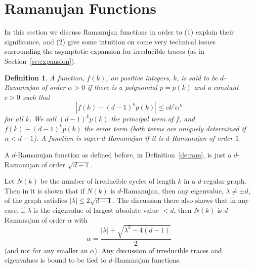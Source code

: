 \documentclass[12pt]{article}
\newtheorem{definition}[theorem]{Definition}
\newcommand{\dtreelike}{{$d$-Ramanujan}}
\begin{document}
\section{Ramanujan Functions}

In this section we discuss Ramanujan functions in order to (1) explain
their significance, and (2) give some intuition on some very technical
issues surrounding the asymptotic expansion for irreducible traces
(as in Section~\ref{se:expansion}).

\begin{definition} A function, $f(k)$, on positive integers, $k$, is
said to be {\em {\dtreelike} of order $\alpha>0$}
if there is a polynomial $p=p(k)$ and a
constant $c>0$ such
that
$$
|f(k)-(d-1)^kp(k)|\le ck^c \alpha^k
$$
for all $k$.  We call $(d-1)^kp(k)$ the {\em principal term} of $f$,
and $f(k)-(d-1)^kp(k)$ the {\em error term} (both terms are uniquely
determined if $\alpha<d-1$).  A function is {\em super-{\dtreelike}}
if it is {\dtreelike} of order $1$.
\end{definition} 
A {\dtreelike} function as defined before, in Definition~\ref{de:ram},
is just a 
{\dtreelike} of order $\sqrt{d-1}$.

Let $N(k)$ be the number of irreducible cycles of length $k$
in a $d$-regular graph.  Then
in \cite{lubotzky} it is shown that if $N(k)$ is {\dtreelike}, then
any eigenvalue, $\lambda\ne \pm d$, of the graph satisfies 
$|\lambda|\le 2\sqrt{d-1}$.  The discussion there also shows that
in any case,
if $\lambda$ is the eigenvalue of largest absolute value $<d$, then
$N(k)$ is {\dtreelike} of order $\alpha$ with
$$
\alpha = \frac{ |\lambda|+\sqrt{\lambda^2-4(d-1)}}{2}
$$
(and not for any smaller an $\alpha$).
Any discussion of irreducible traces and eigenvalues is bound to be tied to
{\dtreelike} functions.
\end{document}
